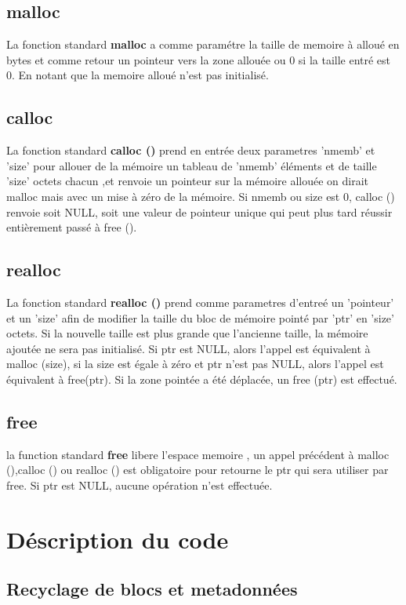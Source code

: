 \documentclass[12pt,a4paper]{article}
\begin{document}
\subsection{malloc}
La fonction standard \textbf{malloc} a comme paramétre la taille de memoire à alloué en bytes  et comme retour un pointeur vers la zone allouée ou 0 si la taille entré est 0. En notant que la memoire alloué n'est pas initialisé. 

\subsection{calloc}
La fonction standard \textbf{calloc ()} prend en entrée deux parametres 'nmemb' et 'size' pour allouer de la mémoire un tableau de 'nmemb' éléments et de taille 'size' octets chacun ,et 
renvoie un pointeur sur la mémoire allouée on dirait malloc mais avec un mise à zéro de la mémoire. Si nmemb ou size est 0, calloc () renvoie soit NULL, soit une valeur de pointeur unique qui peut plus tard réussir entièrement passé à free ().

\subsection{realloc}

La fonction standard \textbf{realloc ()} prend comme parametres d'entreé un 'pointeur' et un 'size' afin de modifier la taille du bloc de mémoire pointé par 'ptr' en 'size' octets.
 Si la nouvelle taille est plus grande que l'ancienne taille, la mémoire ajoutée ne sera pas initialisé. Si ptr est NULL, alors l'appel est équivalent à malloc (size), si la size est égale à zéro et ptr n'est pas NULL, alors l'appel est équivalent à free(ptr). Si la zone pointée a été déplacée, un free (ptr) est effectué.

\subsection{free}
la function standard \textbf{free} libere l'espace memoire , un appel précédent à malloc (),calloc () ou realloc () est obligatoire pour retourne le ptr qui sera utiliser par free. Si ptr est NULL, aucune opération n'est effectuée.

\section{Déscription du code}
\subsection {Recyclage de blocs et metadonnées}
\end{document}
